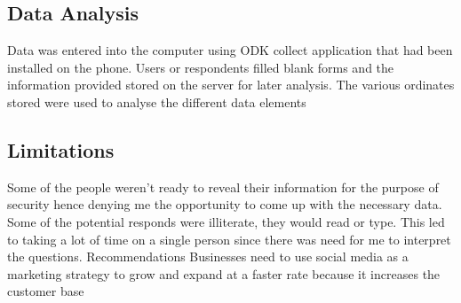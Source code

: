 \documentclass[12pt]{article}
\begin{document}
\subsection{Data Analysis }
Data was entered into the computer using ODK collect application that had been installed on the phone. Users or respondents filled blank forms and the information provided stored on the server for later analysis.
 The various ordinates stored were used to analyse the different data elements

\subsection{Limitations }
Some of the people weren’t ready to reveal their information for the purpose of security hence denying me the opportunity to come up with the necessary data.
Some of the potential responds were illiterate, they would read or type. This led to taking a lot of time on a single person since there was need for me to interpret the questions.
Recommendations
Businesses need to use social media as a marketing strategy to grow and expand at a faster rate because it increases the customer base
\end{document}
